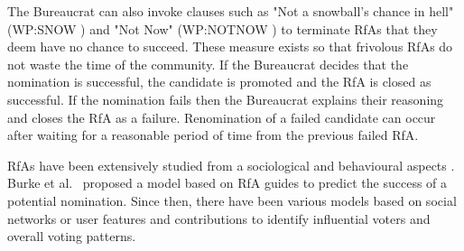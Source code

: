 The Bureaucrat can also invoke clauses such as "Not a snowball's chance in hell" (WP:SNOW \cite{wiki:wp:snow}) and "Not Now" (WP:NOTNOW \cite{wiki:wp:notnow}) to terminate RfAs that they deem have no chance to succeed.
These measure exists so that frivolous RfAs do not waste the time of the community.
If the Bureaucrat decides that the nomination is successful, the candidate is promoted and the RfA is closed as successful.
If the nomination fails then the Bureaucrat explains their reasoning and closes the RfA as a failure.
Renomination of a failed candidate can occur after waiting for a reasonable period of time from the previous failed RfA.

RfAs have been extensively studied from a sociological and behavioural aspects \cite{derthick2011collaborative,kordzadeh2016revisiting}.
Burke et al.\ \cite{burke2008mopping} proposed a model based on RfA guides to predict the success of a potential nomination.
Since then, there have been various models based on social networks  \cite{putzke2017stated,cabunducan2011voting,picot-clemente2015social} or user features and contributions \cite{clemente2015contribution,asim2018personal} to identify influential voters and overall voting patterns. 
